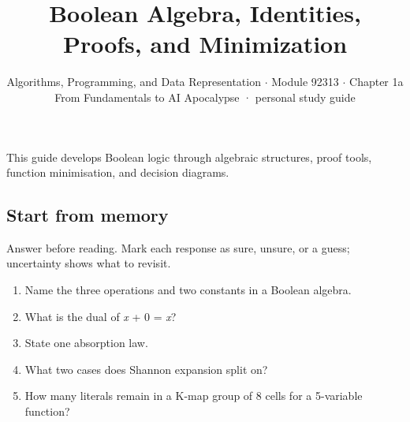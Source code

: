 \documentclass[11pt]{article}
\title{\sffamily\bfseries\color{FAUblue}Boolean Algebra, Identities, Proofs, and Minimization}
\author{Algorithms, Programming, and Data Representation \ensuremath{\cdot} Module 92313 \ensuremath{\cdot} Chapter 1a\\[2pt]\small From Fundamentals to AI Apocalypse · personal study guide}
\date{}
\begin{document}
\maketitle
\begingroup\footnotesize\setlength{\parskip}{0pt}\tableofcontents\endgroup
\clearpage

{\large This guide develops Boolean logic through algebraic structures, proof tools, function minimisation, and decision diagrams.}


\begin{keepsection}
\section{Start from memory}

Answer before reading. Mark each response as sure, unsure, or a guess; uncertainty shows what to revisit.

\begin{enumerate}
\item Name the three operations and two constants in a Boolean algebra.
\item What is the dual of \textit{x} + 0 = \textit{x}?
\item State one absorption law.
\item What two cases does Shannon expansion split on?
\item How many literals remain in a K-map group of 8 cells for a 5-variable function?
\end{enumerate}

\end{keepsection}
\end{document}
